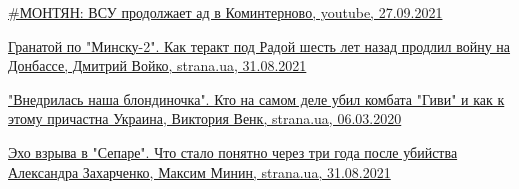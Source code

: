  
 
 
 
 

\href{https://www.youtube.com/watch?v=iRAeuD2yDyM}{%
\#МОНТЯН: ВСУ продолжает ад в Коминтерново, youtube, 27.09.2021%
}

\href{https://strana.news/news/351230-vzryv-hranaty-u-verkhovnoj-rady-chto-s-delom-humenjuka-i-krajnjaka-spustja-6-let.html}{%
Гранатой по "Минску-2". Как теракт под Радой шесть лет назад продлил войну на Донбассе, %
Дмитрий Войко, strana.ua, 31.08.2021%
}

\href{https://strana.news/news/253390-smert-hivi-kak-ukrainskie-spetssluzhby-ubili-komandira-somali.html}{%
"Внедрилась наша блондиночка". Кто на самом деле убил комбата "Гиви" и как к этому причастна Украина, %
Виктория Венк, strana.ua, 06.03.2020%
}

\href{https://strana.news/news/351170-ubijstvo-zakharchenko-chto-stalo-ponjatno-cherez-tri-hoda-posle-vzryva-v-separe.html}{%
Эхо взрыва в "Сепаре". Что стало понятно через три года после убийства Александра Захарченко, %
Максим Минин, strana.ua, 31.08.2021%
}
